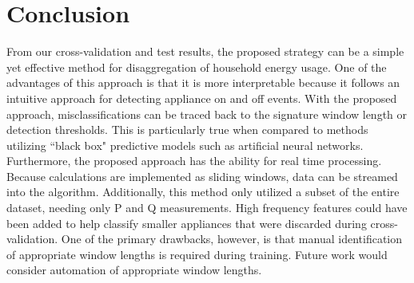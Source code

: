 \documentclass[conference]{IEEEtran}
\begin{document}
\section{Conclusion}\label{sec:concl}
From our cross-validation and test results, the proposed strategy can be a simple yet effective method for disaggregation of household energy usage. One of the advantages of this approach is that it is more interpretable because it follows an intuitive approach for detecting appliance on and off events.  With the proposed approach, misclassifications can be traced back to the signature window length or detection thresholds.  This is particularly true when compared to methods utilizing ``black box" predictive models such as artificial neural networks.  Furthermore, the proposed approach has the ability for real time processing. Because calculations are implemented as sliding windows, data can be streamed into the algorithm. Additionally, this method only utilized a subset of the entire dataset, needing only P and Q measurements.  High frequency features could have been added to help classify smaller appliances that were discarded during cross-validation.  One of the primary drawbacks, however, is that manual identification of appropriate window lengths is required during training.  Future work would consider automation of appropriate window lengths.

	




%
%







%
%
%
\end{document}
